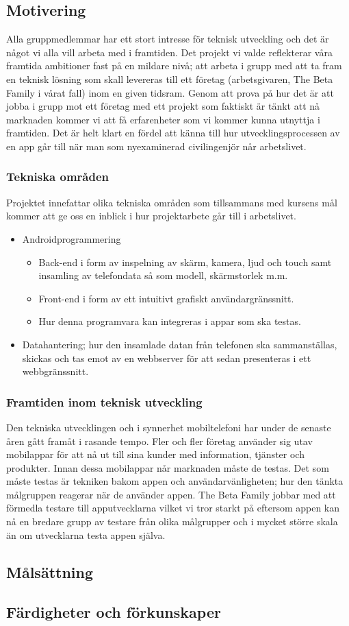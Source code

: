 \subsection{Motivering}
Alla gruppmedlemmar har ett stort intresse för teknisk utveckling och det är något vi alla vill arbeta med i framtiden. Det projekt vi valde reflekterar våra framtida ambitioner fast på en mildare nivå; att arbeta i grupp med att ta fram en teknisk lösning som skall levereras till ett företag (arbetsgivaren, The Beta Family i vårat fall) inom en given tidsram. Genom att prova på hur det är att jobba i grupp mot ett företag med ett projekt som faktiskt är tänkt att nå marknaden kommer vi att få erfarenheter som vi kommer kunna utnyttja i framtiden. Det är helt klart en fördel att känna till hur utvecklingsprocessen av en app går till när man som nyexaminerad civilingenjör når arbetslivet.

\subsubsection{Tekniska områden}

Projektet innefattar olika tekniska områden som tillsammans med kursens mål kommer att ge oss en inblick i hur projektarbete går till i arbetslivet. 
\begin{itemize}
	\item Androidprogrammering
	\begin{itemize}
		\item Back-end i form av inspelning av skärm, kamera, ljud och touch samt insamling av telefondata så som modell, skärmstorlek m.m.
		\item Front-end i form av ett intuitivt grafiskt användargränssnitt.
		\item Hur denna programvara kan integreras i appar som ska testas.
	\end{itemize}
	\item Datahantering; hur den insamlade datan från telefonen ska sammanställas, skickas och tas emot av en webbserver för att sedan presenteras i ett webbgränssnitt.
\end{itemize}

\subsubsection{Framtiden inom teknisk utveckling}
Den tekniska utvecklingen och i synnerhet mobiltelefoni har under de senaste åren gått framåt i rasande tempo. Fler och fler företag använder sig utav mobilappar för att nå ut till sina kunder med information, tjänster och produkter. Innan dessa mobilappar når marknaden måste de testas. Det som måste testas är tekniken bakom appen och användarvänligheten; hur den tänkta målgruppen reagerar när de använder appen. The Beta Family jobbar med att förmedla testare till apputvecklarna vilket vi tror starkt på eftersom appen kan nå en bredare grupp av testare från olika målgrupper och i mycket större skala än om utvecklarna testa appen själva.

\subsection{Målsättning}
\subsection{Färdigheter och förkunskaper}
